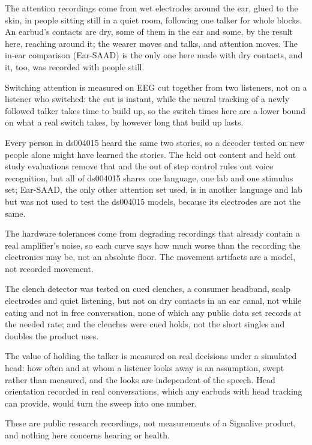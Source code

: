 The attention recordings come from wet electrodes around the ear, glued to the skin, in people sitting still in a quiet room, following one talker for whole blocks. An earbud's contacts are dry, some of them in the ear and some, by the result here, reaching around it; the wearer moves and talks, and attention moves. The in-ear comparison (Ear-SAAD) is the only one here made with dry contacts, and it, too, was recorded with people still.

Switching attention is measured on EEG cut together from two listeners, not on a listener who switched: the cut is instant, while the neural tracking of a newly followed talker takes time to build up, so the switch times here are a lower bound on what a real switch takes, by however long that build up lasts.

Every person in ds004015 heard the same two stories, so a decoder tested on new people alone might have learned the stories. The held out content and held out study evaluations remove that and the out of step control rules out voice recognition, but all of ds004015 shares one language, one lab and one stimulus set; Ear-SAAD, the only other attention set used, is in another language and lab but was not used to test the ds004015 models, because its electrodes are not the same.

The hardware tolerances come from degrading recordings that already contain a real amplifier's noise, so each curve says how much worse than the recording the electronics may be, not an absolute floor. The movement artifacts are a model, not recorded movement.

The clench detector was tested on cued clenches, a consumer headband, scalp electrodes and quiet listening, but not on dry contacts in an ear canal, not while eating and not in free conversation, none of which any public data set records at the needed rate; and the clenches were cued holds, not the short singles and doubles the product uses.

The value of holding the talker is measured on real decisions under a simulated head: how often and at whom a listener looks away is an assumption, swept rather than measured, and the looks are independent of the speech. Head orientation recorded in real conversations, which any earbuds with head tracking can provide, would turn the sweep into one number.


These are public research recordings, not measurements of a Signalive product, and nothing here concerns hearing or health.
